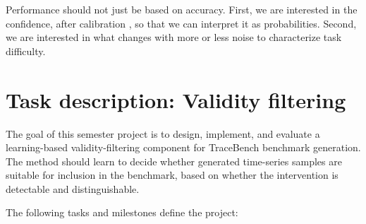 \documentclass[11pt]{article}
\begin{document}
Performance should not just be based on accuracy. 
First, we are interested in the confidence, after calibration \cite{guo2017calibration}, so that we can interpret it as probabilities.
Second, we are interested in what changes with more or less noise to characterize task difficulty.


\section*{Task description: Validity filtering}

The goal of this semester project is to design, implement, and evaluate a learning-based validity-filtering component for TraceBench benchmark generation. The method should learn to decide whether generated time-series samples are suitable for inclusion in the benchmark, based on whether the intervention is detectable and distinguishable.

The following tasks and milestones define the project:
\end{document}
